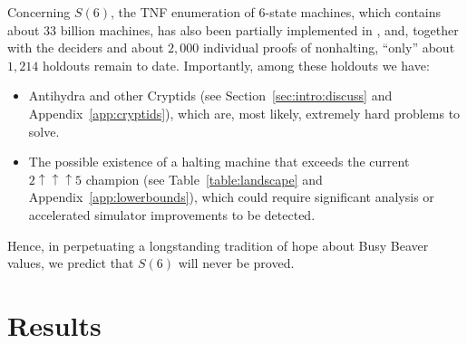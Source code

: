 \documentclass[letterpaper,british,11pt]{article}
\theoremstyle{definition} %
\numberwithin{equation}{section}
\theoremstyle{definition} %
\newcommand{\numBBsholdouts}{1{,}214}
\newcommand{\rado}{Rad\'o\xspace}
\newcommand{\CoqBB}{Coq-BB5\xspace}
\begin{document}
Concerning $S(6)$, the TNF enumeration of 6-state machines, which contains about 33 billion machines, has also been partially implemented in \Coq, and, together with the deciders and about $2{,}000$ individual proofs of nonhalting, ``only'' about $\numBBsholdouts$ holdouts remain to date. Importantly, among these holdouts we have:
\begin{itemize}[label=--]
    \item Antihydra and other Cryptids (see Section~\ref{sec:intro:discuss} and Appendix~\ref{app:cryptids}), which are, most likely, extremely hard problems to solve.
    \item The possible existence of a halting machine that exceeds the current $2\uparrow\uparrow\uparrow5$ champion (see Table~\ref{table:landscape} and Appendix~\ref{app:lowerbounds}), which could require significant analysis or accelerated simulator improvements to be detected.
\end{itemize}


Hence, in perpetuating a longstanding tradition of hope about Busy Beaver values, we predict that $S(6)$ will never be proved.


\section{Results}\label{sec:results}

\end{document}
